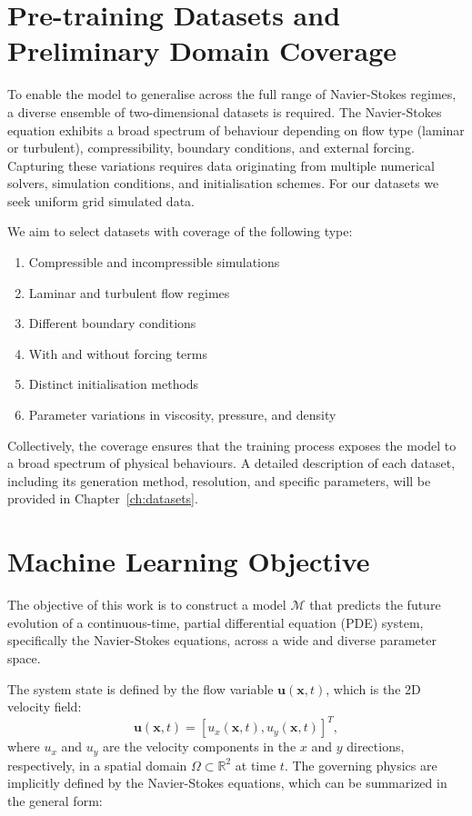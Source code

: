 \section{Pre-training Datasets and Preliminary Domain Coverage}\label{se:datasetconditions}

To enable the model to generalise across the full range of Navier-Stokes regimes, a diverse ensemble of two-dimensional datasets is required. The Navier-Stokes equation exhibits a broad spectrum of behaviour depending on flow type (laminar or turbulent), compressibility, boundary conditions, and external forcing. Capturing these variations requires data originating from multiple numerical solvers, simulation conditions, and initialisation schemes. For our datasets we seek uniform grid simulated data.

We aim to select datasets with coverage of the following type:
\begin{enumerate}
	\item Compressible and incompressible simulations
	\item Laminar and turbulent flow regimes
	\item Different boundary conditions
	\item With and without forcing terms
	\item Distinct initialisation methods
	\item Parameter variations in viscosity, pressure, and density
\end{enumerate}

Collectively, the coverage ensures that the training process exposes the model to a broad spectrum of physical behaviours. A detailed description of each dataset, including its generation method, resolution, and specific parameters, will be provided in Chapter~\ref{ch:datasets}. 
\section{Machine Learning Objective}

The objective of this work is to construct a model $\mathcal{M}$ that predicts the future evolution of a continuous-time, partial differential equation (PDE) system, specifically the Navier-Stokes equations, across a wide and diverse parameter space.

The system state is defined by the flow variable $\mathbf{u}(\mathbf{x}, t)$, which is the 2D velocity field:
\begin{equation*}
\mathbf{u}(\mathbf{x}, t) = [u_x(\mathbf{x}, t), u_y(\mathbf{x}, t)]^T,
\end{equation*}
where $u_x$ and $u_y$ are the velocity components in the $x$ and $y$ directions, respectively, in a spatial domain $\Omega \subset \mathbb{R}^2$ at time $t$. The governing physics are implicitly defined by the Navier-Stokes equations, which can be summarized in the general form:

